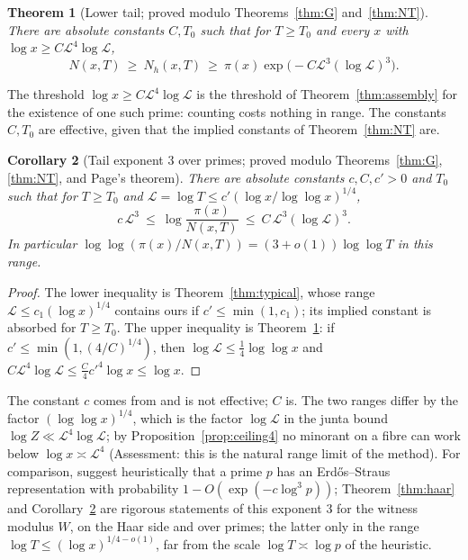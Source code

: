 \documentclass[11pt,reqno]{amsart}
\newtheorem{theorem}{Theorem}[section]
\newtheorem{corollary}[theorem]{Corollary}
\theoremstyle{definition}
\newcommand{\Lc}{\mathcal L}
\begin{document}
\begin{theorem}[Lower tail; proved modulo Theorems~\ref{thm:G} and~\ref{thm:NT}]\label{thm:lowertail}
There are absolute constants $C,T_0$ such that for $T\ge T_0$ and every $x$ with
$\log x\ge C\Lc^4\log\Lc$,
\[
 N(x,T)\ \ge\ N_h(x,T)\ \ge\ \pi(x)\exp\big(-C\Lc^3(\log\Lc)^3\big).
\]
\end{theorem}

The threshold $\log x\ge C\Lc^4\log\Lc$ is the threshold of
Theorem~\ref{thm:assembly} for the existence of one such prime: counting
costs nothing in range.  The constants $C,T_0$ are effective, given that the
implied constants of Theorem~\ref{thm:NT} are.

\begin{corollary}[Tail exponent $3$ over primes; proved modulo Theorems~\ref{thm:G}, \ref{thm:NT}, \cite{TQ} and Page's theorem]\label{cor:twosided}
There are absolute constants $c,C,c'>0$ and $T_0$ such that for $T\ge T_0$ and
$\Lc=\log T\le c'(\log x/\log\log x)^{1/4}$,
\[
 c\,\Lc^3\ \le\ \log\frac{\pi(x)}{N(x,T)}\ \le\ C\,\Lc^3(\log\Lc)^3 .
\]
In particular $\log\log(\pi(x)/N(x,T))=(3+o(1))\log\log T$ in this range.
\end{corollary}

\begin{proof}
The lower inequality is Theorem~\ref{thm:typical}, whose range
$\Lc\le c_1(\log x)^{1/4}$ contains ours if $c'\le\min(1,c_1)$; its implied
constant is absorbed for $T\ge T_0$.  The upper inequality is
Theorem~\ref{thm:lowertail}: if $c'\le\min(1,(4/C)^{1/4})$, then
$\log\Lc\le\frac14\log\log x$ and $C\Lc^4\log\Lc\le\frac C4c'^4\log x\le\log x$.
\end{proof}

The constant $c$ comes from \cite{TQ} and is not effective; $C$ is.  The two
ranges differ by the factor $(\log\log x)^{1/4}$, which is the factor $\log\Lc$
in the junta bound $\log Z\ll\Lc^4\log\Lc$; by Proposition~\ref{prop:ceiling4}
no minorant on a fibre can work below $\log x\asymp\Lc^4$ (Assessment: this is
the natural range limit of the method).  For comparison, \cite[Remark~1.2]{ET}
suggest heuristically that a prime $p$ has an Erd\H{o}s--Straus representation
with probability $1-O(\exp(-c\log^3p))$; Theorem~\ref{thm:haar} and
Corollary~\ref{cor:twosided} are rigorous statements of this exponent $3$ for
the witness modulus $W$, on the Haar side and over primes; the latter only
in the range $\log T\le(\log x)^{1/4-o(1)}$, far from the scale $\log T\asymp\log p$ of the
heuristic.
\end{document}
